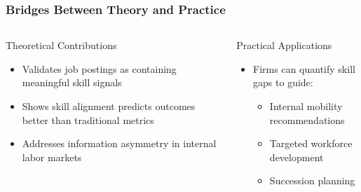 \documentclass[11pt,xcolor={dvipsnames},hyperref={pdftex,pdfpagemode=UseNone,hidelinks,pdfdisplaydoctitle=true},usepdftitle=false]{beamer}
\begin{document}
\begin{frame}
\frametitle{Bridges Between Theory and Practice}
\begin{columns}
\begin{column}{0.48\textwidth}
\begin{block}{Theoretical Contributions}
\begin{itemize}
\item Validates job postings as containing meaningful skill signals
\item Shows skill alignment predicts outcomes better than traditional metrics
\item Addresses information asymmetry in internal labor markets
\end{itemize}
\end{block}
\end{column}

\begin{column}{0.48\textwidth}
\begin{block}{Practical Applications}
\begin{itemize}
\item Firms can quantify skill gaps to guide:
\begin{itemize}
\item Internal mobility recommendations
\item Targeted workforce development
\item Succession planning
\end{itemize}
\end{itemize}
\end{block}
\end{column}
\end{columns}

\vspace{1em}

\begin{center}
\end{center}
\end{frame}
\end{document}
